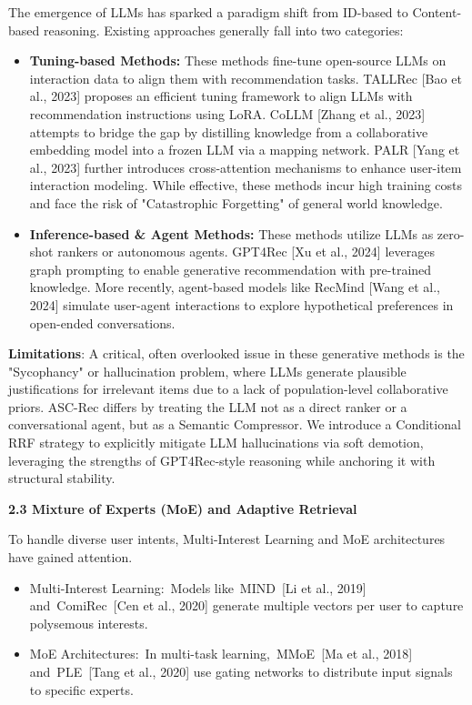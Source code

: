 \documentclass[]{article}
\begin{document}
The emergence of LLMs has sparked a paradigm shift from ID-based to
Content-based reasoning. Existing approaches generally fall into two
categories:

\begin{itemize}
\item
  \textbf{Tuning-based Methods:} These methods fine-tune open-source
  LLMs on interaction data to align them with recommendation tasks.
  TALLRec {[}Bao et al., 2023{]} proposes an efficient tuning framework
  to align LLMs with recommendation instructions using LoRA. CoLLM
  {[}Zhang et al., 2023{]} attempts to bridge the gap by distilling
  knowledge from a collaborative embedding model into a frozen LLM via a
  mapping network. PALR {[}Yang et al., 2023{]} further introduces
  cross-attention mechanisms to enhance user-item interaction modeling.
  While effective, these methods incur high training costs and face the
  risk of "Catastrophic Forgetting" of general world knowledge.
\item
  \textbf{Inference-based \& Agent Methods:} These methods utilize LLMs
  as zero-shot rankers or autonomous agents. GPT4Rec {[}Xu et al.,
  2024{]} leverages graph prompting to enable generative recommendation
  with pre-trained knowledge. More recently, agent-based models like
  RecMind {[}Wang et al., 2024{]} simulate user-agent interactions to
  explore hypothetical preferences in open-ended conversations.
\end{itemize}

\textbf{Limitations}: A critical, often overlooked issue in these
generative methods is the "Sycophancy" or hallucination problem, where
LLMs generate plausible justifications for irrelevant items due to a
lack of population-level collaborative priors. ASC-Rec differs by
treating the LLM not as a direct ranker or a conversational agent, but
as a Semantic Compressor. We introduce a Conditional RRF strategy to
explicitly mitigate LLM hallucinations via soft demotion, leveraging the
strengths of GPT4Rec-style reasoning while anchoring it with structural
stability.

\textbf{2.3 Mixture of Experts (MoE) and Adaptive Retrieval}

To handle diverse user intents, Multi-Interest Learning and MoE
architectures have gained attention.

\begin{itemize}
\item
  Multi-Interest Learning:~Models like~MIND~{[}Li et al., 2019{]}
  and~ComiRec~{[}Cen et al., 2020{]} generate multiple vectors per user
  to capture polysemous interests.
\item
  MoE Architectures:~In multi-task learning,~MMoE~{[}Ma et al., 2018{]}
  and~PLE~{[}Tang et al., 2020{]} use gating networks to distribute
  input signals to specific experts.
\end{itemize}
\end{document}
